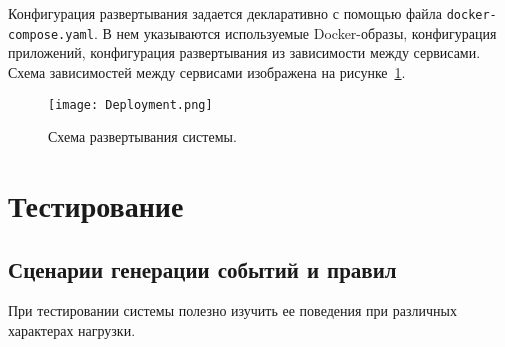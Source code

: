 \documentclass[14pt]{article}
\begin{document}
Конфигурация развертывания задается декларативно с помощью файла  \verb|docker-compose.yaml|. В нем указываются используемые Docker-образы, конфигурация приложений, конфигурация развертывания из зависимости между сервисами. Схема зависимостей между сервисами изображена на рисунке~\ref{fig:deployment}.

\begin{figure}[h]
  \centering
    \texttt{[image: Deployment.png]}
    \caption{Схема развертывания системы.}
    \label{fig:deployment}
\end{figure}

\section{Тестирование}
\label{section:testing}

\subsection{Сценарии генерации событий и правил}
\label{section:generationScenarios}
При тестировании системы полезно изучить ее поведения при различных характерах нагрузки.
\end{document}
